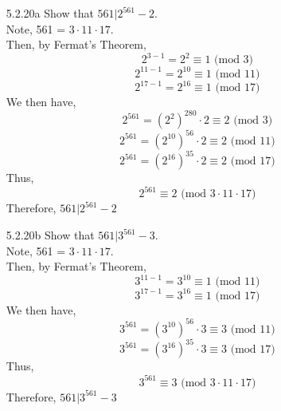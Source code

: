 \documentclass[12pt]{article}
\begin{document}
\begin{enumerate}
	\item[5.2.20a] Show that $ 561 | 2^{561}-2 $.\\
		Note, 561 = $3\cdot11\cdot17 $. \\
		Then, by Fermat's Theorem, 
		\[2^{3-1} = 2^2 \equiv 1 \text{ (mod 3)} \] 
		\[2^{11-1} = 2^{10} \equiv 1 \text{ (mod 11)} \] 
		\[2^{17-1} = 2^{16} \equiv 1 \text{ (mod 17)} \] 
		We then have,
			\[2^{561} = (2^2)^{280}\cdot 2 \equiv 2 \text{ (mod 3)}\]
			\[2^{561} = (2^{10})^{56}\cdot 2 \equiv 2 \text{ (mod 11)}\]
			\[2^{561} = (2^{16})^{35}\cdot 2 \equiv 2 \text{ (mod 17)}\]
		Thus,
			\[2^{561}\equiv 2\text{ (mod $3 \cdot 11 \cdot 17$)}\]
		Therefore,
			$ 561 | 2^{561}-2 $
	\item[5.2.20b] Show that $ 561 | 3^{561}-3 $.\\
		Note, 561 = $3\cdot11\cdot17 $. \\
		Then, by Fermat's Theorem, 
		\[3^{11-1} = 3^{10} \equiv 1 \text{ (mod 11)} \] 
		\[3^{17-1} = 3^{16} \equiv 1 \text{ (mod 17)} \] 
		We then have,
			\[3^{561} = (3^{10})^{56}\cdot 3 \equiv 3 \text{ (mod 11)}\]
			\[3^{561} = (3^{16})^{35}\cdot 3 \equiv 3 \text{ (mod 17)}\]
		Thus,
			\[3^{561}\equiv 3\text{ (mod $3 \cdot 11 \cdot 17$)}\]
		Therefore,
			$ 561 | 3^{561}-3 $
\end{enumerate}
\end{document}
